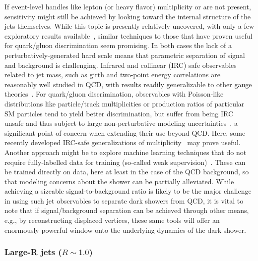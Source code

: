 If event-level handles like lepton (or heavy flavor) multiplicity or \MET are not present, sensitivity might still be achieved by looking toward the internal structure of the jets themselves. While this topic is presently relatively uncovered, with only a few exploratory results available~\cite{Park:2017rfb}, similar techniques to those that have proven useful for quark/gluon discrimination seem promising. In both cases the lack of a perturbatively-generated hard scale means that parametric separation of signal and background is challenging. Infrared and collinear (IRC) safe observables related to jet mass, such as girth and two-point energy correlations are reasonably well studied in QCD, with results readily generalizable to other gauge theories~\cite{Gallicchio:2010dq,Larkoski:2013eya,Larkoski:2014gra}. For quark/gluon discrimination, observables with Poisson-like distributions like particle/track multiplicities or production ratios of particular SM particles tend to yield better discrimination, but suffer from being IRC unsafe and thus subject to large non-perturbative modeling uncertainties~\cite{Gras:2017jty}, a significant point of concern when extending their use beyond QCD. Here, some recently developed IRC-safe generalizations of multiplicity~\cite{Frye:2017yrw} may prove useful.  Another approach might be to explore machine learning techniques that do not require fully-labelled data for training (so-called weak supervision)~\cite{Dery:2017fap,Cohen:2017exh,Metodiev:2017vrx}.  These can be trained directly on data, here at least in the case of the QCD background, so that modeling concerns about the shower can be partially alleviated.  While achieving a sizeable signal-to-background ratio is likely to be the major challenge in using such jet observables to separate dark showers from QCD, it is vital to note that if signal/background separation can be achieved through other means, e.g., by reconstructing displaced vertices, these same tools will offer an enormously powerful window onto the underlying dynamics of the dark shower. 



\subsubsection{Large-R jets ($R \sim 1.0$)}
\label{sec:darkshowerfatjet}

